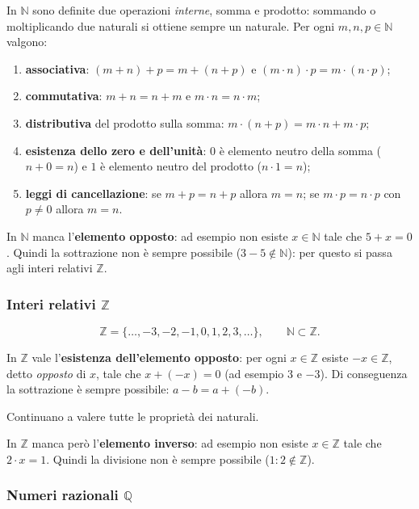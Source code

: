 \documentclass[11pt,a4paper]{article}
\begin{document}
In $\mathbb{N}$ sono definite due operazioni \emph{interne}, somma e
prodotto: sommando o moltiplicando due naturali si ottiene sempre un
naturale. Per ogni $m, n, p \in \mathbb{N}$ valgono:
\begin{enumerate}
    \item \textbf{associativa}: $(m + n) + p = m + (n + p)$ e
          $(m \cdot n) \cdot p = m \cdot (n \cdot p)$;
    \item \textbf{commutativa}: $m + n = n + m$ e $m \cdot n = n \cdot m$;
    \item \textbf{distributiva} del prodotto sulla somma:
          $m \cdot (n + p) = m \cdot n + m \cdot p$;
    \item \textbf{esistenza dello zero e dell'unità}: $0$ è elemento neutro
          della somma ($n + 0 = n$) e $1$ è elemento neutro del prodotto
          ($n \cdot 1 = n$);
    \item \textbf{leggi di cancellazione}: se $m + p = n + p$ allora $m = n$;
          se $m \cdot p = n \cdot p$ con $p \neq 0$ allora $m = n$.
\end{enumerate}

In $\mathbb{N}$ manca l'\textbf{elemento opposto}: ad esempio non esiste
$x \in \mathbb{N}$ tale che $5 + x = 0$. Quindi la sottrazione non è
sempre possibile ($3 - 5 \notin \mathbb{N}$): per questo si passa agli
interi relativi $\mathbb{Z}$.


\subsubsection{Interi relativi $\mathbb{Z}$}

\[
\mathbb{Z} = \{\dots, -3, -2, -1, 0, 1, 2, 3, \dots\}, \qquad
\mathbb{N} \subset \mathbb{Z}.
\]

In $\mathbb{Z}$ vale l'\textbf{esistenza dell'elemento opposto}: per ogni
$x \in \mathbb{Z}$ esiste $-x \in \mathbb{Z}$, detto \emph{opposto} di $x$,
tale che $x + (-x) = 0$ (ad esempio $3$ e $-3$). Di conseguenza la
sottrazione è sempre possibile: $a - b = a + (-b)$.

Continuano a valere tutte le proprietà dei naturali.

In $\mathbb{Z}$ manca però l'\textbf{elemento inverso}: ad esempio non
esiste $x \in \mathbb{Z}$ tale che $2 \cdot x = 1$. Quindi la divisione
non è sempre possibile ($1 : 2 \notin \mathbb{Z}$).

\subsubsection{Numeri razionali $\mathbb{Q}$}
\end{document}
